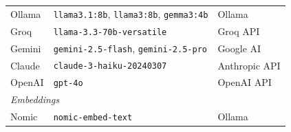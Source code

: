 \documentclass[12pt,a4paper]{report}
\begin{document}
\begin{table}[H]
\begin{tabularx}{\textwidth}{@{}l l l@{}}
Ollama           & \texttt{llama3.1:8b}, \texttt{llama3:8b}, \texttt{gemma3:4b} & Ollama \\
Groq             & \texttt{llama-3.3-70b-versatile}                 & Groq API \\
Gemini           & \texttt{gemini-2.5-flash}, \texttt{gemini-2.5-pro} & Google AI \\
Claude           & \texttt{claude-3-haiku-20240307}                 & Anthropic API \\
OpenAI           & \texttt{gpt-4o}                                  & OpenAI API \\
\midrule
\multicolumn{3}{l}{\textit{Embeddings}} \\
Nomic            & \texttt{nomic-embed-text}                        & Ollama \\
\bottomrule
\end{tabularx}
\end{table}
	
\end{document}
